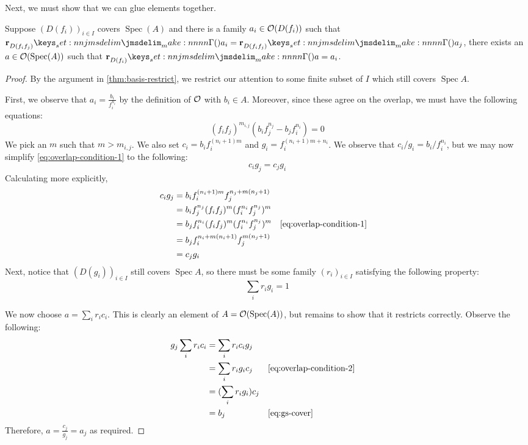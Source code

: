 \documentclass{amsart}
\DeclareMathOperator{\Spec}{Spec}
\begin{document}
Next, we must show that we can glue elements together.
\begin{theorem}
  \label{thm:basis-glue}
  Suppose $(D(f_i))_{i \in I}$ covers $\Spec(A)$ and there is a family $a_i \in \mathcal{O}(D(f_i))$
  such that $\Res{a_i}{D(f_if_j)} = \Res{a_j}{D(f_if_j)}$, there exists an
  $a \in \StructSh(\Spec(A))$ such that $\Res{a}{D(f_i)} = a_i$.
\end{theorem}
\begin{proof}
  By the argument in \cref{thm:basis-restrict}, we restrict our attention to some finite subset of
  $I$ which still covers $\Spec A$.

  First, we observe that $a_i = \frac{b_i}{f_i^{n_i}}$ by the definition of $\mathcal{O}$ with
  $b_i \in A$. Moreover, since these agree on the overlap, we must have the following equations:
  \begin{equation}
    \label{eq:overlap-condition-1}
    (f_if_j)^{m_{i,j}}(b_if_j^{n_j} - b_jf_i^{n_i}) = 0
  \end{equation}
  We pick an $m$ such that $m > m_{i,j}$. We also set $c_i = b_if_i^{(n_i + 1)m}$ and
  $g_i = f_i^{(n_i + 1)m + n_i}$. We observe that $c_i/g_i = b_i/f_i^{n_i}$, but we may now simplify
  \cref{eq:overlap-condition-1} to the following:
  \begin{equation}
    \label{eq:overlap-condition-2}
    c_ig_j = c_jg_i
  \end{equation}
  Calculating more explicitly,
  \begin{align*}
    c_ig_j
    &= b_if_i^{(n_i + 1)m}f_j^{n_j + m(n_j + 1)}\\
    &= b_if_j^{n_j} (f_if_j)^{m}(f_i^{n_i}f_j^{n_j})^m\\
    &= b_jf_i^{n_i} (f_if_j)^{m}(f_i^{n_i}f_j^{n_j})^m && \text{\cref{eq:overlap-condition-1}}\\
    &= b_jf_i^{n_i + m(n_i + 1)}f_j^{m(n_j + 1)}\\
    &= c_j g_i
  \end{align*}
  Next, notice that $(D(g_i))_{i \in I}$ still covers $\Spec A$, so there must be some family
  $(r_i)_{i \in I}$ satisfying the following property:
  \begin{equation}
    \label{eq:gs-cover}
    \sum_i r_ig_i = 1
  \end{equation}

  We now choose $a = \sum_i r_ic_i$. This is clearly an element of $A = \StructSh(\Spec(A))$, but
  remains to show that it restricts correctly. Observe the following:
  \begin{align*}
    g_j \sum_i r_ic_i
    &= \sum_i r_i c_ig_j\\
    &= \sum_i r_i g_i c_j && \text{\cref{eq:overlap-condition-2}}\\
    &= (\sum_i r_i g_i) c_j\\
    &= b_j && \text{\cref{eq:gs-cover}}
  \end{align*}
  Therefore, $a = \frac{c_j}{g_j} = a_j$ as required.
\end{proof}
\end{document}
